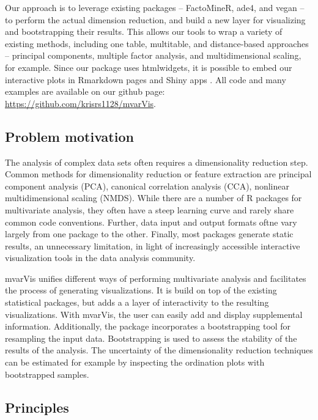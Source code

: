 Our approach is to leverage existing packages -- FactoMineR, ade4, and vegan
\citep{le2008factominer, dray2007ade4, oksanen2007vegan} -- to perform the
actual dimension reduction, and build a new layer for visualizing and
bootstrapping their results. This allows our tools to wrap a variety of existing
methods, including one table, multitable, and distance-based approaches --
principal components, multiple factor analysis, and multidimensional scaling,
for example. Since our package uses htmlwidgets, it is possible to embed our
interactive plots in Rmarkdown pages and Shiny apps
\citep{vaidyanathan2014htmlwidgets}. All code and many examples are available on
our github page: \url{https://github.com/krisrs1128/mvarVis}.

\subsection{Problem motivation}

The analysis of complex data sets often requires a dimensionality reduction
step. Common methods for dimensionality reduction or feature extraction are
principal component analysis (PCA), canonical correlation analysis (CCA),
nonlinear multidimensional scaling (NMDS). While there are a number of R
packages for multivariate analysis, they often have a steep learning curve and
rarely share common code conventions. Further, data input and output formats
oftne vary largely from one package to the other. Finally, most packages
generate static results, an unnecessary limitation, in light of increasingly
accessible interactive visualization tools in the data analysis community.

mvarVis unifies different ways of performing multivariate analysis and
facilitates the process of generating visualizations. It is build on top of the
existing statistical packages, but adds a a layer of interactivity to the
resulting visualizations. With mvarVis, the user can easily add and display
supplemental information. Additionally, the package incorporates a bootstrapping
tool for resampling the input data. Bootstrapping is used to assess the
stability of the results of the analysis. The uncertainty of the dimensionality
reduction techniques can be estimated for example by inspecting the ordination
plots with bootstrapped samples.

\subsection{Principles}

